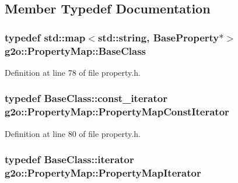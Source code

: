 \subsection{Member Typedef Documentation}
\subsubsection[{\texorpdfstring{Base\+Class}{BaseClass}}]{\setlength{\rightskip}{0pt plus 5cm}typedef std\+::map$<$std\+::string, {\bf Base\+Property}$\ast$$>$ {\bf g2o\+::\+Property\+Map\+::\+Base\+Class}}\hypertarget{classg2o_1_1PropertyMap_ac57ddbe51d16070e697fe314889fee03}{}\label{classg2o_1_1PropertyMap_ac57ddbe51d16070e697fe314889fee03}


Definition at line 78 of file property.\+h.

\subsubsection[{\texorpdfstring{Property\+Map\+Const\+Iterator}{PropertyMapConstIterator}}]{\setlength{\rightskip}{0pt plus 5cm}typedef Base\+Class\+::const\+\_\+iterator {\bf g2o\+::\+Property\+Map\+::\+Property\+Map\+Const\+Iterator}}\hypertarget{classg2o_1_1PropertyMap_af09ea140ab099b1762e9634b7fdcaf52}{}\label{classg2o_1_1PropertyMap_af09ea140ab099b1762e9634b7fdcaf52}


Definition at line 80 of file property.\+h.

\subsubsection[{\texorpdfstring{Property\+Map\+Iterator}{PropertyMapIterator}}]{\setlength{\rightskip}{0pt plus 5cm}typedef Base\+Class\+::iterator {\bf g2o\+::\+Property\+Map\+::\+Property\+Map\+Iterator}}\hypertarget{classg2o_1_1PropertyMap_af5dd0defe4a5096f0d5602b38e837a78}{}\label{classg2o_1_1PropertyMap_af5dd0defe4a5096f0d5602b38e837a78}


